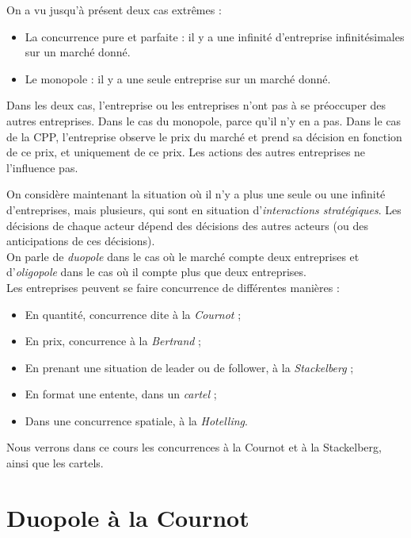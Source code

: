 \documentclass[
]{book}
\providecommand{\tightlist}{%
  \setlength{\itemsep}{0pt}\setlength{\parskip}{0pt}}
\theoremstyle{definition}
\theoremstyle{definition}
\theoremstyle{definition}
\theoremstyle{definition}
\theoremstyle{remark}
\begin{document}
On a vu jusqu'à présent deux cas extrêmes :

\begin{itemize}
\tightlist
\item
  La concurrence pure et parfaite :
  il y a une infinité d'entreprise infinitésimales sur un marché donné.
\item
  Le monopole : il y a une seule entreprise sur un marché donné.
\end{itemize}

Dans les deux cas, l'entreprise ou les entreprises n'ont pas à se préoccuper des autres entreprises.
Dans le cas du monopole, parce qu'il n'y en a pas.
Dans le cas de la CPP, l'entreprise observe le prix du marché et prend sa décision en fonction de ce prix, et uniquement de ce prix.
Les actions des autres entreprises ne l'influence pas.

On considère maintenant la situation où il n'y a plus une seule ou une infinité d'entreprises, mais plusieurs, qui sont en situation d'\emph{interactions stratégiques}.
Les décisions de chaque acteur dépend des décisions des autres acteurs (ou des anticipations de ces décisions).\\
On parle de \emph{duopole} dans le cas où le marché compte deux entreprises et d'\emph{oligopole} dans le cas où il compte plus que deux entreprises.\\
Les entreprises peuvent se faire concurrence de différentes manières :

\begin{itemize}
\tightlist
\item
  En quantité, concurrence dite à la \emph{Cournot} ;
\item
  En prix, concurrence à la \emph{Bertrand} ;
\item
  En prenant une situation de leader ou de follower, à la \emph{Stackelberg} ;
\item
  En format une entente, dans un \emph{cartel} ;
\item
  Dans une concurrence spatiale, à la \emph{Hotelling}.
\end{itemize}

Nous verrons dans ce cours les concurrences à la Cournot et à la Stackelberg, ainsi que les cartels.

\hypertarget{duopole-uxe0-la-cournot}{%
\section{Duopole à la Cournot}\label{duopole-uxe0-la-cournot}}
\end{document}
